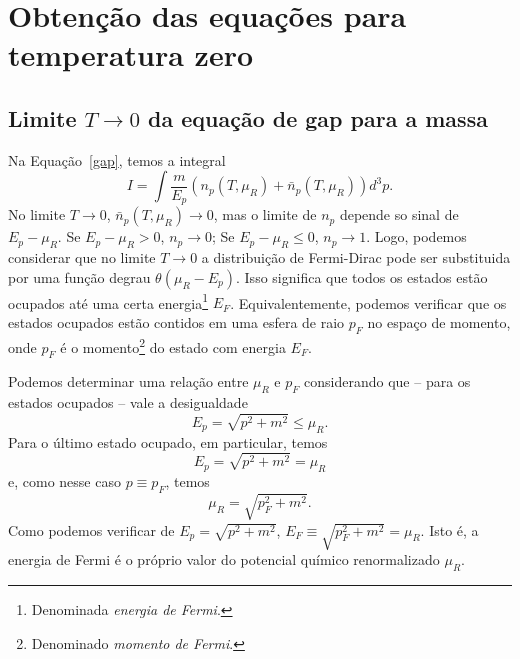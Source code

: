 \section{Obtenção das equações para temperatura zero}
\label{Sec:Obtencao_eq_temp_zero_NJL_quarks}

\subsection{Limite $T \to 0$ da equação de gap para a massa}

Na Equação~\eqref{gap}, temos a integral
\begin{equation}
	I = \int \frac{m}{E_p} (n_p(T, \mu_R) + \bar{n}_p(T, \mu_R)) d^3p.
\end{equation}
%
No limite $T \to 0$, $\bar{n}_p(T, \mu_R) \to 0$, mas o limite de $n_p$ depende so sinal de $E_p - \mu_R$. Se $E_p - \mu_R > 0$, $n_p \to 0$; Se $E_p - \mu_R \leqslant 0$, $n_p \to 1$. Logo, podemos considerar que no limite $T \to 0$ a distribuição de Fermi-Dirac pode ser substituida por uma função degrau $\theta(\mu_R - E_p)$. Isso significa que todos os estados estão ocupados até uma certa energia\footnote{Denominada \emph{energia de Fermi}.} $E_F$. Equivalentemente, podemos verificar que os estados ocupados estão contidos em uma esfera de raio $p_F$ no espaço de momento, onde $p_F$ é o momento\footnote{Denominado \emph{momento de Fermi}.} do estado com energia $E_F$. 

Podemos determinar uma relação entre $\mu_R$ e $p_F$ considerando que -- para os estados ocupados -- vale a desigualdade
\begin{equation}
	E_p = \sqrt{p^2 + m^2} \leqslant \mu_R.
\end{equation}
%
Para o último estado ocupado, em particular, temos
\begin{equation}
	E_p = \sqrt{p^2 + m^2} = \mu_R
\end{equation}
%
e, como nesse caso $p \equiv p_F$, temos
\begin{equation}
	\mu_R = \sqrt{p_F^2 + m^2}.
\end{equation}
%
Como podemos verificar de $E_p = \sqrt{p^2 + m^2}$, $E_F \equiv \sqrt{p_F^2 + m^2} = \mu_R$. Isto é, a energia de Fermi é o próprio valor do potencial químico renormalizado $\mu_R$.

